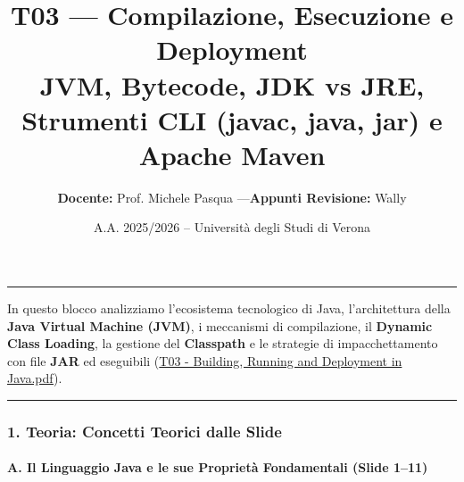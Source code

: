 \documentclass[11pt,a4paper]{article}
\title{\Huge\bfseries\sffamily\color{brandblue} T03 --- Compilazione, Esecuzione e Deployment \\[0.3em] \large\sffamily JVM, Bytecode, JDK vs JRE, Strumenti CLI (javac, java, jar) e Apache Maven}
\author{\textbf{Docente:} Prof. Michele Pasqua \quad---\quad \textbf{Appunti Revisione:} Wally}
\date{A.A. 2025/2026 -- Universit\`a degli Studi di Verona}
\begin{document}
\maketitle
\thispagestyle{fancy}
\vspace{-1.2em}
\noindent\textcolor{brandblue}{\rule{\textwidth}{0.8pt}}
\vspace{1.2em}

In questo blocco analizziamo l'ecosistema tecnologico di Java,
l'architettura della \textbf{Java Virtual Machine (JVM)}, i meccanismi
di compilazione, il \textbf{Dynamic Class Loading}, la gestione del
\textbf{Classpath} e le strategie di impacchettamento con file
\textbf{JAR} ed eseguibili
(\href{file:///home/wally/Documenti/GitHub/Programmazione-II/25-26/Teoria-e-Esercitazioni/Slides-20260902/T03\%20-\%20Building,\%20Running\%20and\%20Deployment\%20in\%20Java.pdf}{T03
- Building, Running and Deployment in Java.pdf}).

\begin{center}\rule{0.5\linewidth}{0.5pt}\end{center}

\subsubsection{1. Teoria: Concetti Teorici dalle
Slide}\label{teoria-concetti-teorici-dalle-slide}

\paragraph{A. Il Linguaggio Java e le sue Proprietà Fondamentali (Slide
1--11)}\label{a.-il-linguaggio-java-e-le-sue-proprietuxe0-fondamentali-slide-111}
\end{document}
